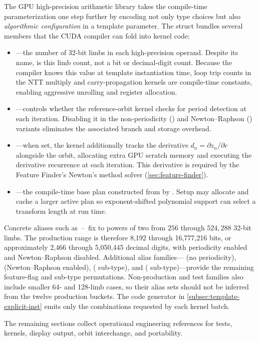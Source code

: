 The GPU high-precision arithmetic library takes the compile-time
parameterization one step further by encoding not only type choices but
also \emph{algorithmic configuration} in a template parameter.
The struct
bundles several  members that the CUDA compiler
can fold into kernel code:

\begin{itemize}
  \item {}---the number of 32-bit limbs in each
        high-precision operand.  Despite its name,  is this
        limb count, not a bit or decimal-digit count.  Because
        the compiler knows this value at template instantiation time,
        loop trip counts in the NTT multiply and carry-propagation
        kernels are compile-time constants, enabling aggressive
        unrolling and register allocation.
  \item {}---controls whether the reference-orbit
        kernel checks for period detection at each iteration.  Disabling
        it in the non-periodicity () and
        Newton--Raphson () variants eliminates
        the associated branch and storage overhead.
  \item {}---when set, the kernel additionally
        tracks the derivative $d_n = \partial z_n/\partial c$ alongside
        the orbit, allocating extra GPU scratch memory and executing the
        derivative recurrence at each iteration.  This derivative is required by
        the Feature Finder's Newton's method solver
        (\cref{sec:feature-finder}).
  \item {}---the compile-time base plan constructed from
         by .  Setup may allocate
        and cache a larger active plan so exponent-shifted polynomial support
        can select a transform length at run time.
\end{itemize}

\noindent
Concrete aliases such as
\,--\, fix
 to powers of two from $256$ through $524{,}288$
32-bit limbs.  The production range is therefore 8,192 through 16,777,216
bits, or approximately 2,466 through 5,050,445 decimal digits, with
periodicity enabled and Newton--Raphson disabled.
Additional alias families--- (no periodicity),
 (Newton--Raphson enabled),
 ( sub-type), and
 ( sub-type)---provide the
remaining feature-flag and sub-type permutations.  Non-production and test
families also include smaller 64- and 128-limb cases, so their alias sets should
not be inferred from the twelve production buckets.  The code generator in
\cref{subsec:template-explicit-inst} emits only the combinations requested by
each kernel batch.

The remaining sections collect operational engineering references for tests,
kernels, display output, orbit interchange, and portability.
